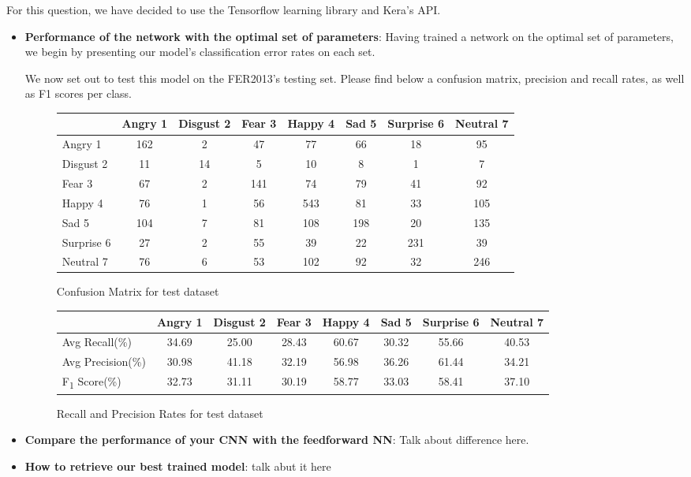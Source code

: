 For this question, we have decided to use the Tensorflow learning library and Kera's API.

\begin{itemize}

\item \textbf{Performance of the network with the optimal set of parameters}:
  Having trained a network on the optimal set of parameters,
  we begin by presenting our model's classification error rates on each set.
  
  We now set out to test this model on the FER2013's testing set.
  Please find below a confusion matrix, precision and recall rates, as well as F1 scores per class.
  \begin{figure}[h]
  \begin{center}
    \caption{Confusion Matrix for test dataset}
    \begin{tabular}{ | l || c | c | c | c | c | c | c |}
    \hline
          & Angry 1 & Disgust 2 & Fear 3 & Happy 4 & Sad 5 & Surprise 6 & Neutral 7 \\ \hline \hline
        Angry 1 & 162 & 2 & 47 & 77 & 66 & 18 & 95 \\ \hline
        Disgust 2 & 11 & 14 & 5 & 10 & 8 & 1 & 7 \\ \hline
        Fear 3 & 67 & 2 & 141 & 74 & 79 & 41 & 92 \\ \hline
        Happy 4 & 76 & 1 & 56 & 543 & 81 & 33 & 105 \\ \hline
        Sad 5 & 104 & 7 & 81 & 108 & 198 & 20 & 135 \\ \hline
        Surprise 6 & 27 & 2 & 55 & 39 & 22 & 231 & 39 \\ \hline
        Neutral 7 & 76 & 6 & 53 & 102 & 92 & 32 & 246 \\ \hline
    \end{tabular}
    \label{fig:confusionMatrix}
\end{center}
\end{figure}

  
\begin{figure}[h]
\begin{center}
\caption{Recall and Precision Rates for test dataset}
\begin{tabular}{ | l || c | c | c | c | c | c | c |}
  \hline
         & Angry 1 & Disgust 2 & Fear 3 & Happy 4 & Sad 5 & Surprise 6 & Neutral 7 \\ \hline \hline
        Avg Recall(\%) & 34.69 & 25.00 & 28.43 & 60.67 & 30.32 & 55.66 & 40.53 \\ \hline
        Avg Precision(\%) & 30.98 & 41.18 & 32.19 & 56.98 & 36.26 & 61.44 & 34.21 \\ \hline
        F\textsubscript{1} Score(\%) & 32.73 & 31.11 & 30.19 & 58.77 & 33.03 & 58.41 & 37.10 \\ \hline
    \end{tabular}
    \label{fig:averageRecall}
\end{center}
\end{figure}


\item \textbf{Compare the performance of your CNN with the feedforward NN}:
  Talk about difference here.


\item \textbf{How to retrieve our best trained model}:
  talk abut it here
\end{itemize}
